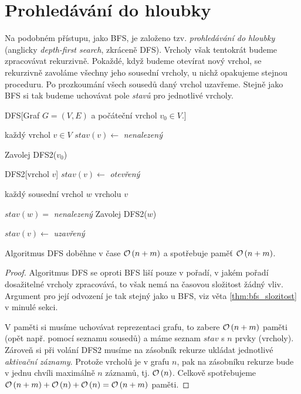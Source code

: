 \section{Prohledávání do hloubky}\label{sec:dfs}
Na podobném přístupu, jako BFS, je založeno tzv. \emph{prohledávání do hloubky} (anglicky \emph{depth-first search}, zkráceně DFS). Vrcholy však tentokrát budeme zpracovávat rekurzivně. Pokaždé, když budeme otevírat nový vrchol, se rekurzivně zavoláme všechny jeho sousední vrcholy, u nichž opakujeme stejnou proceduru. Po prozkoumání všech sousedů daný vrchol uzavřeme. Stejně jako BFS si tak budeme uchovávat pole \emph{stavů} pro jednotlivé vrcholy.
\begin{pseudo}{DFS}[Graf $G=(V,E)$ a počáteční vrchol $v_0\in V$.]
    \begin{For}{každý vrchol $v\in V$}
        $stav(v)\gets$ \textit{nenalezený}
    \end{For}
    Zavolej DFS2($v_0$)\\

    \begin{Function}{DFS2}[vrchol $v$]
        $stav(v)\gets$ \textit{otevřený}\\
        \begin{For}{každý sousední vrchol $w$ vrcholu $v$}
            \begin{If}{$stav(w)=$ \textit{nenalezený}}
                Zavolej DFS2($w$)
            \end{If}
        \end{For}
        $stav(v)\gets$ \textit{uzavřený}
    \end{Function}
\end{pseudo}
\begin{theorem}\label{thm:dfs_slozitost}
    Algoritmus DFS doběhne v čase $\mathcal{O}\left(n+m\right)$ a spotřebuje paměť $\mathcal{O}\left(n+m\right)$.
\end{theorem}
\begin{proof}
    Algoritmus DFS se oproti BFS liší pouze v pořadí, v jakém pořadí dosažitelné vrcholy zpracovává, to však nemá na časovou složitost žádný vliv. Argument pro její odvození je tak stejný jako u BFS, viz věta \ref{thm:bfs_slozitost} v minulé sekci.

    V paměti si musíme uchovávat reprezentaci grafu, to zabere $\mathcal{O}\left(n+m\right)$ paměti (opět např. pomocí seznamu sousedů) a máme seznam $stav$ s $n$ prvky (vrcholy). Zároveň si při volání \textsc{DFS2} musíme na zásobník rekurze ukládat jednotlivé \emph{aktivační záznamy}. Protože vrcholů je v grafu $n$, pak na zásobníku rekurze bude v jednu chvíli maximálně $n$ záznamů, tj. $\mathcal{O}\left(n\right)$. Celkově spotřebujeme $\mathcal{O}\left(n+m\right)+\mathcal{O}\left(n\right)+\mathcal{O}\left(n\right)=\mathcal{O}\left(n+m\right)$ paměti.
\end{proof}